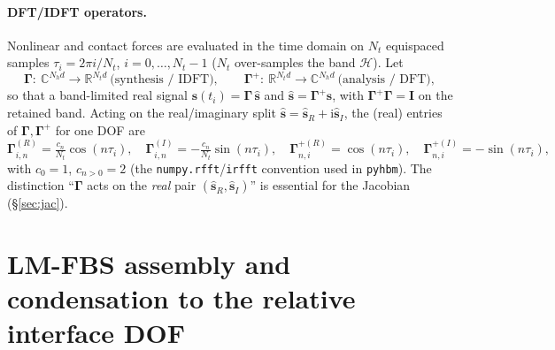 \documentclass[11pt]{article}
\newcommand{\R}{\mathbb{R}}
\newcommand{\C}{\mathbb{C}}
\newcommand{\Ib}{\bm{I}}
\newcommand{\Gam}{\bm{\Gamma}}
\begin{document}
\paragraph{DFT/IDFT operators.}
Nonlinear and contact forces are evaluated in the time domain on
$N_t$ equispaced samples $\tau_i=2\pi i/N_t$, $i=0,\dots,N_t-1$
($N_t$ over-samples the band $\mathcal H$). Let
\begin{equation}
\Gam:\ \C^{N_h d}\!\to\R^{N_t d}\ \text{(synthesis / IDFT)},
\qquad
\Gam^{+}:\ \R^{N_t d}\!\to\C^{N_h d}\ \text{(analysis / DFT)},
\label{eq:dft}
\end{equation}
so that a band-limited real signal $\bm s(t_i)=\Gam\,\hat{\bm s}$ and
$\hat{\bm s}=\Gam^{+}\bm s$, with $\Gam^{+}\Gam=\Ib$ on the retained band.
Acting on the real/imaginary split $\hat{\bm s}=\hat{\bm s}_R+\mathrm i\hat{\bm s}_I$,
the (real) entries of $\Gam,\Gam^{+}$ for one DOF are
\begin{equation}
\Gam_{i,n}^{(R)}=\tfrac{c_n}{N_t}\cos(n\tau_i),\quad
\Gam_{i,n}^{(I)}=-\tfrac{c_n}{N_t}\sin(n\tau_i),\quad
\Gam^{+(R)}_{n,i}=\cos(n\tau_i),\quad
\Gam^{+(I)}_{n,i}=-\sin(n\tau_i),
\label{eq:dftentries}
\end{equation}
with $c_0=1$, $c_{n>0}=2$ (the \texttt{numpy.rfft}/\texttt{irfft}
convention used in \texttt{pyhbm}). The distinction
``$\Gam$ acts on the \emph{real} pair $(\hat{\bm s}_R,\hat{\bm s}_I)$''
is essential for the Jacobian (\S\ref{sec:jac}).

\section{LM-FBS assembly and condensation to the relative interface DOF}
\end{document}
